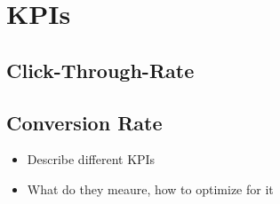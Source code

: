 \section{KPIs}
\subsection{Click-Through-Rate}
\subsection{Conversion Rate}
\begin{itemize}
\item Describe different KPIs
\item What do they meaure, how to optimize for it
\end{itemize}